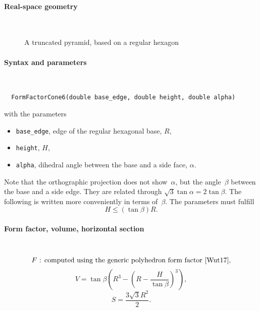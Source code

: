  \label{SCone6}

\paragraph{Real-space geometry}\strut\\

\begin{figure}[H]
\hfill
{}
\hfill
{}
\hfill
{}
\hfill
\caption{A truncated pyramid, based on a regular hexagon}
\end{figure}

\FloatBarrier
\paragraph{Syntax and parameters}\strut\\[-2ex plus .2ex minus .2ex]
\begin{lstlisting}
  FormFactorCone6(double base_edge, double height, double alpha)
\end{lstlisting}
with the parameters
\begin{itemize}
\item \texttt{base\_edge}, edge of the regular hexagonal base, $R$,
\item \texttt{height}, $H$,
\item \texttt{alpha}, dihedral angle between the base and a side face, $\alpha$.
\end{itemize}
Note that the orthographic projection does not show~$\alpha$,
but the angle~$\beta$ between the base and a side edge.
They are related through $\sqrt{3}\tan \alpha = 2 \tan \beta$.
The following is written more conveniently in terms of~$\beta$.
The parameters must fulfill
\begin{displaymath}
  H \le (\tan\beta)R.
\end{displaymath}

\paragraph{Form factor, volume, horizontal section}\strut\\
\begin{equation*}
  F \text{~: computed using the generic polyhedron form factor~\cite{Wut17},}
\end{equation*}
\begin{equation*}
  V = \tan\beta  \left( R^3- \left(R-\frac{H}{\tan\beta}\right)^3 \right),
\end{equation*}
\begin{equation*}
  S =\dfrac{3\sqrt{3}R^2}{2}.
\end{equation*}

